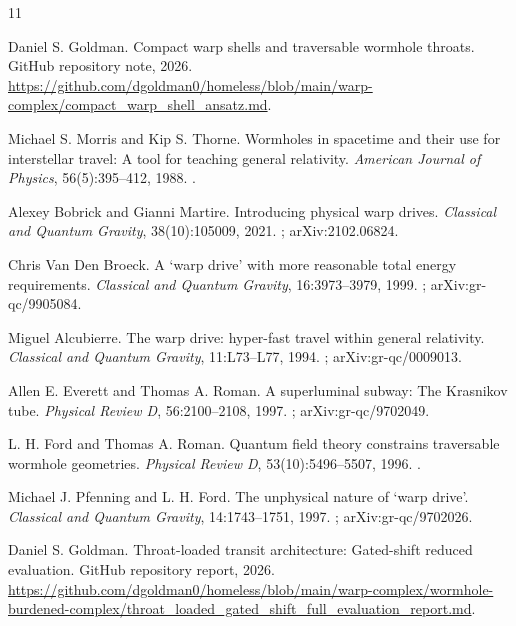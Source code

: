 \documentclass[11pt]{article}
\begin{document}
\begin{thebibliography}{11}

Daniel S. Goldman.
\newblock Compact warp shells and traversable wormhole throats.
\newblock GitHub repository note, 2026.
\newblock \url{https://github.com/dgoldman0/homeless/blob/main/warp-complex/compact_warp_shell_ansatz.md}.

Michael S. Morris and Kip S. Thorne.
\newblock Wormholes in spacetime and their use for interstellar travel: A tool for teaching general relativity.
\newblock \emph{American Journal of Physics}, 56(5):395--412, 1988.
\newblock {}.

Alexey Bobrick and Gianni Martire.
\newblock Introducing physical warp drives.
\newblock \emph{Classical and Quantum Gravity}, 38(10):105009, 2021.
\newblock {}; arXiv:2102.06824.

Chris Van Den Broeck.
\newblock A `warp drive' with more reasonable total energy requirements.
\newblock \emph{Classical and Quantum Gravity}, 16:3973--3979, 1999.
\newblock {}; arXiv:gr-qc/9905084.

Miguel Alcubierre.
\newblock The warp drive: hyper-fast travel within general relativity.
\newblock \emph{Classical and Quantum Gravity}, 11:L73--L77, 1994.
\newblock {}; arXiv:gr-qc/0009013.

Allen E. Everett and Thomas A. Roman.
\newblock A superluminal subway: The Krasnikov tube.
\newblock \emph{Physical Review D}, 56:2100--2108, 1997.
\newblock {}; arXiv:gr-qc/9702049.

L. H. Ford and Thomas A. Roman.
\newblock Quantum field theory constrains traversable wormhole geometries.
\newblock \emph{Physical Review D}, 53(10):5496--5507, 1996.
\newblock {}.

Michael J. Pfenning and L. H. Ford.
\newblock The unphysical nature of `warp drive'.
\newblock \emph{Classical and Quantum Gravity}, 14:1743--1751, 1997.
\newblock {}; arXiv:gr-qc/9702026.

Daniel S. Goldman.
\newblock Throat-loaded transit architecture: Gated-shift reduced evaluation.
\newblock GitHub repository report, 2026.
\newblock \url{https://github.com/dgoldman0/homeless/blob/main/warp-complex/wormhole-burdened-complex/throat_loaded_gated_shift_full_evaluation_report.md}.


\end{thebibliography}
\end{document}
